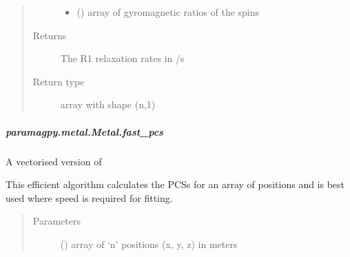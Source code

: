 \documentclass[a4paper,10pt,english,openany,oneside]{sphinxmanual}
\begin{document}
\begin{fulllineitems}
\begin{fulllineitems}
\begin{fulllineitems}
\begin{quote}
\begin{description}
\begin{itemize}
\item {} 
 (\sphinxstyleliteralemphasis{\sphinxupquote{ (}}\sphinxstyleliteralemphasis{\sphinxupquote{,}}\sphinxstyleliteralemphasis{\sphinxupquote{)}}) \textendash{} array of gyromagnetic ratios of the spins

\end{itemize}

\item[{Returns}] \leavevmode
{} \textendash{} The R1 relaxation rates in /s

\item[{Return type}] \leavevmode
array with shape (n,1)

\end{description}\end{quote}

\end{fulllineitems}



\subparagraph{paramagpy.metal.Metal.fast\_pcs}
\label{\detokenize{reference/generated/paramagpy.metal.Metal.fast_pcs:paramagpy-metal-metal-fast-pcs}}\label{\detokenize{reference/generated/paramagpy.metal.Metal.fast_pcs::doc}}

\begin{fulllineitems}
\label{\detokenize{reference/generated/paramagpy.metal.Metal.fast_pcs:paramagpy.metal.Metal.fast_pcs}}
A vectorised version of {\hyperref[\detokenize{reference/generated/paramagpy.metal.Metal.pcs:paramagpy.metal.Metal.pcs}]{}}

This efficient algorithm calculates the PCSs for an array of
positions and is best used where speed is required for fitting.
\begin{quote}\begin{description}
\item[{Parameters}] \leavevmode
{} (\sphinxstyleliteralemphasis{\sphinxupquote{ (}}\sphinxstyleliteralemphasis{\sphinxupquote{,}}\sphinxstyleliteralemphasis{\sphinxupquote{)}}) \textendash{} array of ‘n’ positions (x, y, z) in meters


\end{description}
\end{quote}
\end{fulllineitems}
\end{fulllineitems}
\end{fulllineitems}
\end{document}
